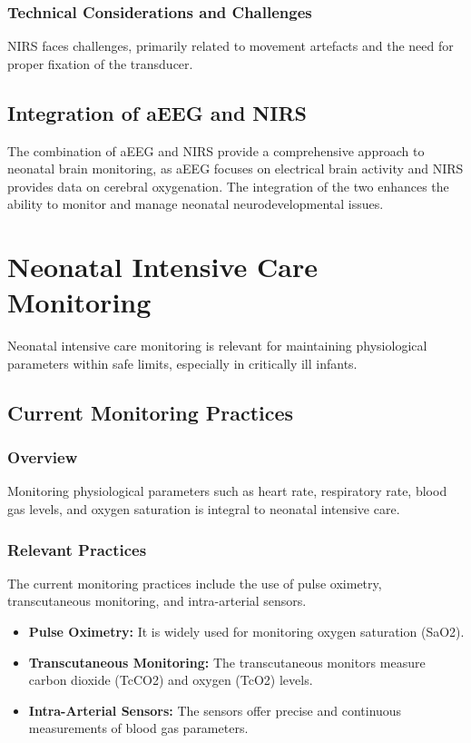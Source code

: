 \documentclass[12pt,journal,compsoc]{IEEEtran}
\begin{document}
\subsubsection{Technical Considerations and Challenges}
NIRS faces challenges, primarily related to movement artefacts and the need for proper fixation of the transducer. 

\subsection{Integration of aEEG and NIRS}
The combination of aEEG and NIRS provide a comprehensive approach to neonatal brain monitoring, as aEEG focuses on electrical brain activity and NIRS provides data on cerebral oxygenation. The integration of the two enhances the ability to monitor and manage neonatal neurodevelopmental issues. 

\section{Neonatal Intensive Care Monitoring}
Neonatal intensive care monitoring is relevant for maintaining physiological parameters within safe limits, especially in critically ill infants.  

\subsection{Current Monitoring Practices}
\subsubsection{Overview}
Monitoring physiological parameters such as heart rate, respiratory rate, blood gas levels, and oxygen saturation is integral to neonatal intensive care. 

\subsubsection{Relevant Practices}
The current monitoring practices include the use of pulse oximetry, transcutaneous monitoring, and intra-arterial sensors. 

\begin{itemize}
    \item \textbf{Pulse Oximetry:} It is widely used for monitoring oxygen saturation (SaO2). 
    \item \textbf{Transcutaneous Monitoring:} The transcutaneous monitors measure carbon dioxide (TcCO2) and oxygen (TcO2) levels.  
    \item \textbf{Intra-Arterial Sensors:} The sensors offer precise and continuous measurements of blood gas parameters. 
\end{itemize}
\end{document}
